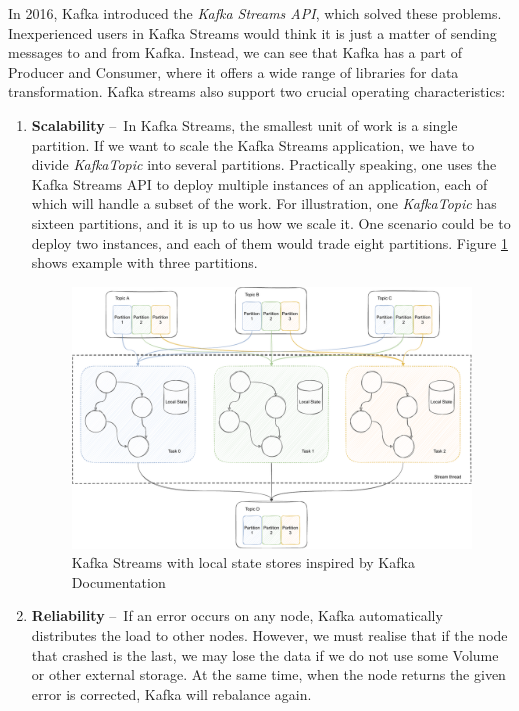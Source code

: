 In 2016, Kafka introduced the \emph{Kafka Streams API}, which solved these problems.
Inexperienced users in Kafka Streams would think it is just a matter of sending messages to and from Kafka.
Instead, we can see that Kafka has a part of Producer and Consumer, where it offers a wide range of libraries for data transformation.
Kafka streams also support two crucial operating characteristics:
\begin{enumerate}[itemsep=1mm, parsep=0pt]
    \item \textbf{Scalability} \---\ In Kafka Streams, the smallest unit of work is a single partition.
    If we want to scale the Kafka Streams application, we have to divide \emph{KafkaTopic} into several partitions.
    Practically speaking, one uses the Kafka Streams API to deploy multiple instances of an application, each of which will handle a subset of the work.
    For illustration, one \emph{KafkaTopic} has sixteen partitions, and it is up to us how we scale it.
    One scenario could be to deploy two instances, and each of them would trade eight partitions.
    Figure \ref{fig:kafkaStreams} shows example with three partitions.

    \begin{figure}[!h]
        \centering
        \includegraphics[scale=0.48]{obrazky-figures/02-preliminaries/02-kafka/07-kafka-streams-with-localstate,thread.pdf}
        \caption{Kafka Streams with local state stores inspired by Kafka Documentation~\cite{kafkaDocumentation}}
        \label{fig:kafkaStreams}
    \end{figure}


    \item \textbf{Reliability} \---\ If an error occurs on any node, Kafka automatically distributes the load to other nodes.
    However, we must realise that if the node that crashed is the last, we may lose the data if we do not use some Volume or other external storage.
    At the same time, when the node returns the given error is corrected, Kafka will rebalance again.
\end{enumerate}

